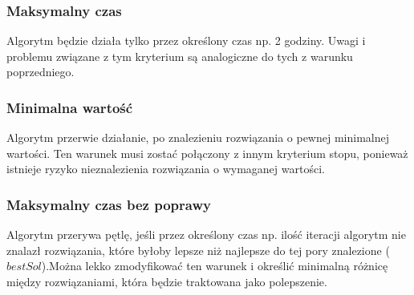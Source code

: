 \subsubsection{Maksymalny czas} 
Algorytm będzie działa tylko przez określony czas
np. 2 godziny. Uwagi i problemu związane z tym kryterium są analogiczne do tych
z warunku poprzedniego.

\subsubsection{Minimalna wartość} 
Algorytm przerwie działanie, po znalezieniu rozwiązania o pewnej minimalnej
wartości. Ten warunek musi zostać połączony z innym kryterium stopu, ponieważ
istnieje ryzyko nieznalezienia rozwiązania o wymaganej wartości.

\subsubsection{Maksymalny czas bez poprawy} 
Algorytm przerywa pętlę, jeśli przez określony czas np. ilość iteracji algorytm
nie znalazł rozwiązania, które byłoby lepsze niż najlepsze do tej pory
znalezione ($bestSol$).Można lekko zmodyfikować ten warunek i określić minimalną
różnicę między rozwiązaniami, która będzie traktowana jako polepszenie. 

